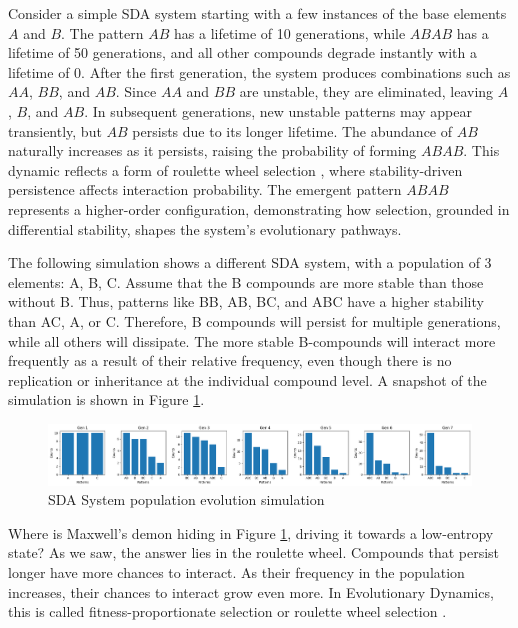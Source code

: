 \documentclass[preprint,12pt]{elsarticle}
\begin{document}
Consider a simple SDA system starting with a few instances of the base elements \( A \) and \( B \). The pattern \( AB \) has a lifetime of 10 generations, while \( ABAB \) has a lifetime of 50 generations, and all other compounds degrade instantly with a lifetime of 0. After the first generation, the system produces combinations such as \( AA \), \( BB \), and \( AB \). Since \( AA \) and \( BB \) are unstable, they are eliminated, leaving \( A \), \( B \), and \( AB \). In subsequent generations, new unstable patterns may appear transiently, but \( AB \) persists due to its longer lifetime. The abundance of \( AB \) naturally increases as it persists, raising the probability of forming \( ABAB \). This dynamic reflects a form of roulette wheel selection \cite{goldberg1989genetic} \cite{holland1975adaptation}, where stability-driven persistence affects interaction probability. The emergent pattern \( ABAB \) represents a higher-order configuration, demonstrating how selection, grounded in differential stability, shapes the system's evolutionary pathways. 

The following simulation shows a different SDA system, with a population of 3 elements: {A, B, C}. Assume that the B compounds are more stable than those without B. Thus, patterns like BB, AB, BC, and ABC have a higher stability than AC, A, or C. Therefore, B compounds will persist for multiple generations, while all others will dissipate. The more stable B-compounds will interact more frequently as a result of their relative frequency, even though there is no replication or inheritance at the individual compound level. A snapshot of the simulation is shown in Figure \ref{fig:figure_2}.

\begin{figure}[htp]
    \centering
    \includegraphics[width=1\textwidth]{figure_2}
    \caption{SDA System population evolution simulation}
    \label{fig:figure_2}
\end{figure}

Where is Maxwell's demon \cite{leff2002maxwell} hiding in Figure \ref{fig:figure_2}, driving it towards a low-entropy state? As we saw, the answer lies in the roulette wheel. Compounds that persist longer have more chances to interact. As their frequency in the population increases, their chances to interact grow even more. In Evolutionary Dynamics, this is called fitness-proportionate selection \cite{back1996evolutionary} or roulette wheel selection \cite{goldberg1989genetic} \cite{holland1975adaptation}.
\end{document}
